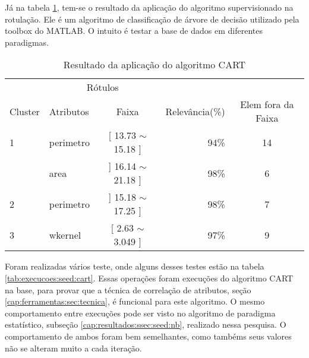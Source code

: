 Já na tabela \ref{tab:rot:seeds:cart}, tem-se o resultado da aplicação do algoritmo supervisionado na rotulação. Ele é um algoritmo de classificação de árvore de decisão utilizado pela toolbox do MATLAB. O intuito é testar a base de dados em diferentes paradigmas.

\begin{table}[!h]
\centering
\caption{Resultado da aplicação do algoritmo CART}
\label{tab:rot:seeds:cart}
\begin{tabular}{llcrc}\hline

\multicolumn{1}{c}{\cellcolor[HTML]{FFFFFF}} & \multicolumn{2}{c}{Rótulos}                      & \multicolumn{1}{r}{}            \\ \cline{2-3}
Cluster                                      & Atributos      & \multicolumn{1}{c}{Faixa}       & \multicolumn{1}{c}{Relevância(\%)} & Elem fora da Faixa \\ \hline \hline
1                                            & perimetro      & [ 13.73 $\sim$ 15.18 ]          & 94\%          & 14\\ \hline
                                             & area           & ] 16.14 $\sim$  21.18 ]          & 98\%         & 6 \\ 
\multirow{-2}{*}{2}                          & perimetro      & ] 15.18 $\sim$  17.25 ]          & 98\%         & 7\\  \hline
3                                            & wkernel        & [ 2.63 $\sim$  3.049 ]         & 97\%           & 9\\ \hline \hline
\end{tabular}
\end{table}


Foram realizadas vários teste, onde alguns desses testes estão na tabela \ref{tab:execucoes:seed:cart}. Essas operações foram execuções do algoritmo CART na base, para provar que a técnica de correlação de atributos, seção \ref{cap:ferramentas:sec:tecnica}, é funcional para este algoritmo. O mesmo comportamento entre execuções pode ser visto no algoritmo de paradigma estatístico, subseção \ref{cap:resultados:ssec:seed:nb}, realizado nessa pesquisa. O  comportamento de ambos foram bem semelhantes, como tambéms seus valores não se alteram muito a cada iteração.


